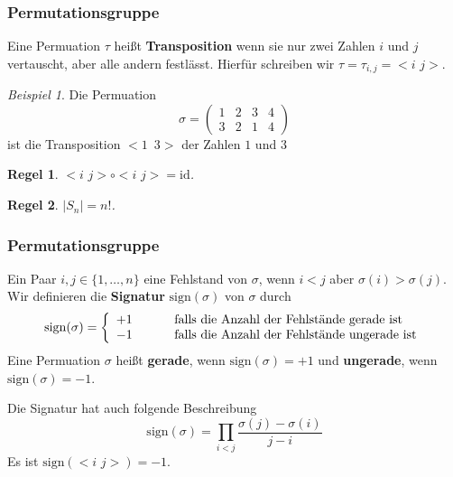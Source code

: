 \documentclass[hyperref={pdfpagelabels=false}]{beamer}
\theoremstyle{plain}%
\newtheorem*{regel}{Regel}
\theoremstyle{definition}
\theoremstyle{remark}
\newtheorem*{beispiel}{Beispiel}
\begin{document}
\begin{frame}
\frametitle{Permutationsgruppe}

Eine Permuation $\tau$ heißt \textbf{Transposition} wenn sie nur zwei Zahlen $i$ und $j$ vertauscht, aber alle 
andern festlässt. \pause Hierfür schreiben wir $\tau =\tau_{i,j} = <\! i \,\, j\! >$. 
\pause

\begin{beispiel} Die Permuation
  	$$ \sigma = \left( \begin{matrix} 1 & 2 & 3 & 4\\ 3 & 2 & 1 & 4 
   	\end{matrix} \right) $$
ist die Transposition $<\!1 \,\,\, 3\!>$ der Zahlen $1$ und $3$
\end{beispiel}
\pause 

\begin{regel} $<\! i \,\, j\!> \circ <\! i \,\, j\! > = \mathrm{id}$. \end{regel}

\pause 

\begin{regel}
$ \vert S_n \vert = n! $.
\end{regel}
\end{frame}

\begin{frame}
\frametitle{Permutationsgruppe}

Ein Paar $i, j \in \{ 1, \ldots , n\}$ eine Fehlstand von $\sigma$, wenn $i < j$ aber
$\sigma(i) > \sigma(j)$. \pause Wir definieren die \textbf{Signatur} 
$\mathrm{sign}(\sigma)$ von $\sigma$ durch
  	$$ \mathrm{sign}(\sigma) = \left\{ \begin{array} {l c l}
	+1 & \quad &\textrm{ falls die Anzahl der Fehlstände gerade ist} \\
	-1 & \quad &\textrm{ falls die Anzahl der Fehlstände ungerade ist} 
	\end{array} \right. $$
\pause
Eine Permuation $\sigma$ heißt \textbf{gerade}, wenn $\mathrm{sign}(\sigma) = +1$ und \textbf{ungerade}, 
wenn $\mathrm{sign}(\sigma) = -1$.

\pause 
Die Signatur hat auch folgende Beschreibung
  	$$ \mathrm{sign}(\sigma) = \prod_{i<j} \frac {\sigma(j) - \sigma(i)}{j - i} $$
\pause 
Es ist $\mathrm{sign}(<\!i\,\,j\!>) = -1$. 
\end{frame}
\end{document}
